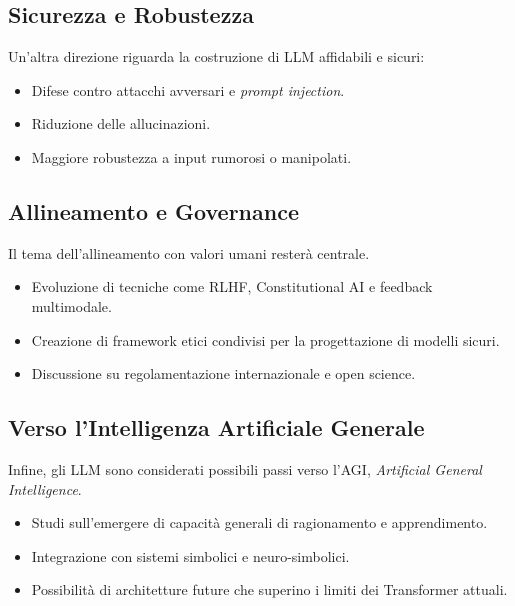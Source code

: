 \subsection{Sicurezza e Robustezza}
Un'altra direzione riguarda la costruzione di LLM affidabili e sicuri:
\begin{itemize}
    \item Difese contro attacchi avversari e \textit{prompt injection}.
    \item Riduzione delle allucinazioni.
    \item Maggiore robustezza a input rumorosi o manipolati.
\end{itemize}

\subsection{Allineamento e Governance}
Il tema dell'allineamento con valori umani resterà centrale.
\begin{itemize}
    \item Evoluzione di tecniche come RLHF, Constitutional AI e feedback multimodale.
    \item Creazione di framework etici condivisi per la progettazione di modelli sicuri.
    \item Discussione su regolamentazione internazionale e open science.
\end{itemize}

\subsection{Verso l'Intelligenza Artificiale Generale}
Infine, gli LLM sono considerati possibili passi verso l'AGI, \textit{Artificial General Intelligence}.
\begin{itemize}
    \item Studi sull'emergere di capacità generali di ragionamento e apprendimento.
    \item Integrazione con sistemi simbolici e neuro-simbolici.
    \item Possibilità di architetture future che superino i limiti dei Transformer attuali.
\end{itemize}